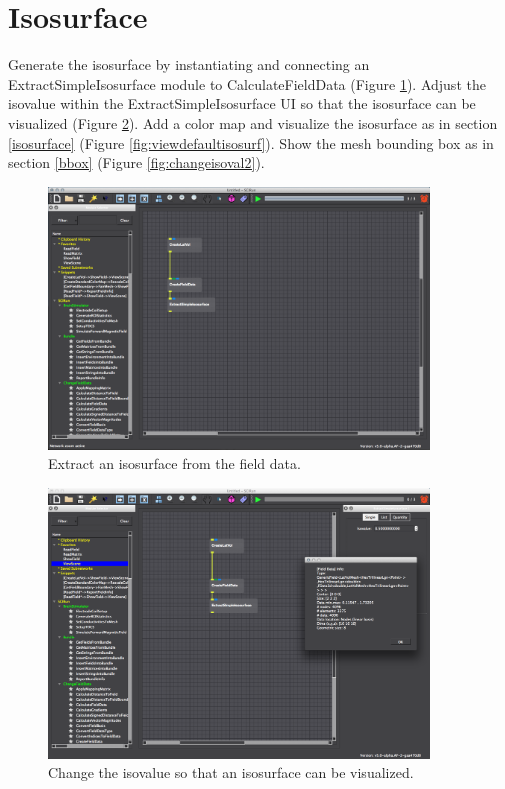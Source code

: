 \documentclass[fleqn,11pt,openany]{book}
\begin{document}
\section{Isosurface}\label{isosurface2}

Generate the isosurface by instantiating and connecting an ExtractSimpleIsosurface module to CalculateFieldData (Figure \ref{fig:extractisosurf2}). Adjust the isovalue within the ExtractSimpleIsosurface UI so that the isosurface can be visualized (Figure \ref{fig:conncolormap}). Add a color map and visualize the isosurface as in section \ref{isosurface} (Figure \ref{fig:viewdefaultisosurf}). Show the mesh bounding box as in section \ref{bbox} (Figure \ref{fig:changeisoval2}).

\begin{figure}[H]
\center
\includegraphics[width=0.9\textwidth]{BasicTutorial_figures/extractiso2.png}
\caption{Extract an isosurface from the field data.}
\label{fig:extractisosurf2}
\end{figure}

\begin{figure}[H]
\center
\includegraphics[width=0.9\textwidth]{BasicTutorial_figures/selectisoval.png}
\caption{Change the isovalue so that an isosurface can be visualized.}
\label{fig:conncolormap}
\end{figure}
\end{document}
